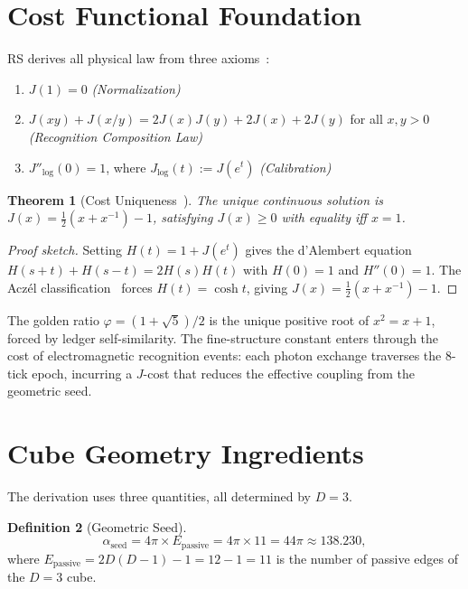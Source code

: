 \documentclass[12pt,a4paper]{article}
\newtheorem{theorem}{Theorem}[section]
\theoremstyle{definition}
\newtheorem{definition}[theorem]{Definition}
\theoremstyle{remark}
\begin{document}
\section{Cost Functional Foundation}
\label{sec:cost}

RS derives all physical law from three axioms~\cite{RS_Axioms}:
\begin{enumerate}[label=(A\arabic*),nosep]
  \item $J(1) = 0$ \hfill\textit{(Normalization)}
  \item $J(xy) + J(x/y) = 2J(x)J(y) + 2J(x) + 2J(y)$ for all $x,y>0$
  \hfill\textit{(Recognition Composition Law)}
  \item $J''_{\log}(0) = 1$, where $J_{\log}(t) := J(e^t)$
  \hfill\textit{(Calibration)}
\end{enumerate}

\begin{theorem}[Cost Uniqueness~\cite{RS_Axioms}]
\label{thm:J}
The unique continuous solution is $J(x) = \tfrac{1}{2}(x+x^{-1})-1$,
satisfying $J(x) \geq 0$ with equality iff $x = 1$.
\end{theorem}

\begin{proof}[Proof sketch]
Setting $H(t) = 1 + J(e^t)$ gives the d'Alembert equation
$H(s+t)+H(s-t)=2H(s)H(t)$ with $H(0)=1$ and $H''(0)=1$.
The Acz\'el classification~\cite{Aczel1966} forces
$H(t)=\cosh t$, giving $J(x) = \tfrac{1}{2}(x+x^{-1})-1$.
\end{proof}

The golden ratio $\varphi = (1+\sqrt{5})/2$ is the unique positive root of
$x^2 = x + 1$, forced by ledger self-similarity.  The fine-structure constant
enters through the cost of electromagnetic recognition events: each photon
exchange traverses the 8-tick epoch, incurring a $J$-cost that reduces the
effective coupling from the geometric seed.

\section{Cube Geometry Ingredients}
\label{sec:ingredients}

The derivation uses three quantities, all determined by $D = 3$.

\begin{definition}[Geometric Seed]
\label{def:seed}
\begin{equation}
  \alpha_{\mathrm{seed}} = 4\pi \times E_{\mathrm{passive}}
  = 4\pi \times 11 = 44\pi \approx 138.230,
\end{equation}
where $E_{\mathrm{passive}} = 2D(D-1) - 1 = 12 - 1 = 11$ is the
number of passive edges of the $D = 3$ cube.
\end{definition}
\end{document}
